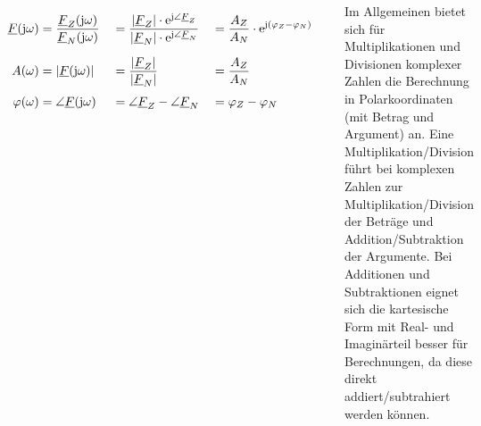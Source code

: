 \begin{frame}[t]
\begin{columns}[T]
{        \begin{align}
            \label{eq:def:F:bruch}
            \underline{F}(\mathrm{j}\omega) 
                            & = \frac{\underline{F}_Z(\mathrm{j}\omega)}{\underline{F}_N(\mathrm{j}\omega)}&
                            & = \frac{|\underline{F}_Z| \cdot \mathrm{e}^{\mathrm{j}\angle{\underline{F}_Z}}}{|\underline{F}_N| \cdot \mathrm{e}^{\mathrm{j}\angle{\underline{F}_N}}}&
                            & = \frac{A_Z}{A_N} \cdot \mathrm{e}^{\mathrm{j} (\varphi_Z - \varphi_N)}
                            \vphantom{\Bigg|}\\
            \label{eq:def:A:bruch}
            A(\omega)       & = |\underline{F}(\mathrm{j}\omega)|&
                            & = \frac{|\underline{F}_Z|}{|\underline{F}_N|}&
                            & = \frac{A_Z}{A_N}&
                            \vphantom{\Bigg|}\\
            \label{eq:def:phi:bruch}
            \varphi(\omega) & = \angle \underline{F}(\mathrm{j}\omega)&
                            & = \angle{\underline{F}_Z} - \angle{\underline{F}_N}&
                            & = \varphi_Z - \varphi_N
        \end{align}

        Im Allgemeinen bietet sich für Multiplikationen und Divisionen komplexer Zahlen die Berechnung in Polarkoordinaten (mit Betrag und Argument) an.
        Eine Multiplikation/Division führt bei komplexen Zahlen zur Multiplikation/Division der Beträge und Addition/Subtraktion der Argumente.
        Bei Additionen und Subtraktionen eignet sich die kartesische Form mit Real- und Imaginärteil besser für Berechnungen, 
        da diese direkt addiert/subtrahiert werden können.
    }
\end{columns}


\end{frame}
